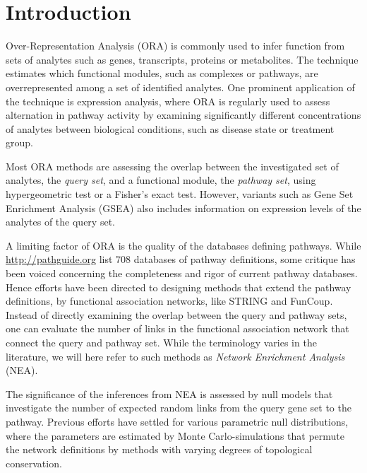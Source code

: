 \documentclass[10pt,letterpaper]{article}
\begin{document}
\section*{Introduction}

Over-Representation Analysis (ORA) is commonly used to infer function from sets of analytes such as genes, transcripts, proteins or metabolites\cite{tavazoie1999systematic,khatri2012ten,goeman2007analyzing}. The technique estimates which functional modules, such as complexes or pathways, are overrepresented among a set of identified analytes. One prominent application of the technique is expression analysis, where ORA is regularly used to assess alternation in pathway activity by examining significantly different concentrations of analytes between biological conditions, such as disease state or treatment group.

Most ORA methods are assessing the overlap between the investigated set of analytes, the {\em query set}, and a functional module, the {\em pathway set}, using hypergeometric test or a Fisher's exact test. However, variants such as Gene Set Enrichment Analysis (GSEA)\cite{subramanian2005gene} also includes information on expression levels of the analytes of the query set.

A limiting factor of ORA is the quality of the databases defining pathways. While \url{http://pathguide.org} list 708 databases of pathway definitions\cite{bader2006pathguide},  some critique has been voiced concerning the completeness and rigor of current pathway databases. Hence efforts have been directed to designing methods that extend the pathway definitions, by functional association networks, like STRING\cite{szklarczyk2014string} and FunCoup\cite{ogris2017funcoup}. Instead of directly examining the overlap between the query and pathway sets, one can evaluate the number of links in the functional association network that connect the query and pathway set\cite{alexeyenko2012network, glaab2012enrichnet, mccormack2013statistical, ogris2016novel, signorelli2016neat}. While the terminology varies in the literature, we will here refer to such methods as {\em Network Enrichment Analysis} (NEA).

The significance of the inferences from NEA is assessed by null models that investigate the number of expected random links from the query gene set to the pathway. Previous efforts have settled for various parametric null distributions, where the parameters are estimated by Monte Carlo-simulations that permute the network definitions by methods with varying degrees of topological conservation.
\end{document}
